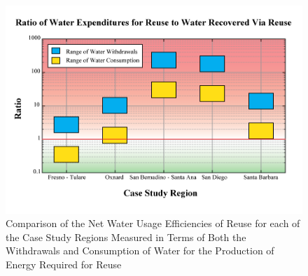     \begin{figure}[!h]
        \begin{center}
        \includegraphics[width=5.5in]{figures/Efficiencies.png}
        \caption{Comparison of the Net Water Usage Efficiencies of Reuse for each of the Case Study Regions Measured in Terms of Both the Withdrawals and Consumption of Water for the Production of Energy Required for Reuse}
        \label{fig:Efficiencies}
        \end{center}
    \end{figure}
